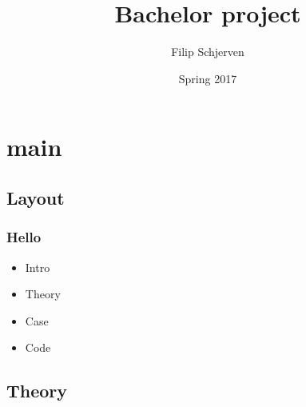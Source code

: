 \documentclass{report}
\title{Bachelor project}
\author{Filip Schjerven}
\date{Spring 2017}
\begin{document}
\maketitle
\tableofcontents
\chapter{main}
\section{Layout}
\subsection{Hello}
\begin{itemize}
\item Intro
\item Theory
\item Case
\item Code
\end{itemize}

\section{Theory}
\end{document}
